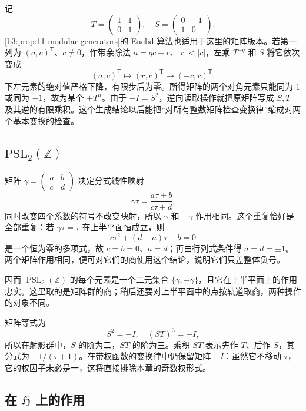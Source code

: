 记
\[
 T=\begin{pmatrix}1&1\\0&1\end{pmatrix},
 \quad S=\begin{pmatrix}0&-1\\1&0\end{pmatrix}.
\]
\cref{b3:prop:11-modular-generators}的 Euclid 算法也适用于这里的矩阵版本。若第一列为 \((a,c)^{\mathsf T}\)、\(c\ne0\)，作带余除法 \(a=qc+r\)、\(|r|<|c|\)，左乘 \(T^{-q}\) 和 \(S\) 将它依次变成
\[
 (a,c)^{\mathsf T}\longmapsto(r,c)^{\mathsf T}
 \longmapsto(-c,r)^{\mathsf T}.
\]
下左元素的绝对值严格下降，有限步后为零。所得矩阵的两个对角元素只能同为 \(1\) 或同为 \(-1\)，故为某个 \(\pm T^n\)。由于 \(-I=S^2\)，逆向读取操作就把原矩阵写成 \(S,T\) 及其逆的有限乘积。这个生成结论以后能把“对所有整数矩阵检查变换律”缩成对两个基本变换的检查。

\subsection{\texorpdfstring{\(\mathrm{PSL}_2(\mathbb Z)\)}{PSL2(Z)}}
\label{b3:subsec:230102}

矩阵 \(\gamma=\left(\begin{smallmatrix}a&b\\c&d\end{smallmatrix}\right)\) 决定分式线性映射
\[
 \gamma\tau=\frac{a\tau+b}{c\tau+d}.
\]
同时改变四个系数的符号不改变映射，所以 \(\gamma\) 和 \(-\gamma\) 作用相同。这个重复恰好是全部重复：若 \(\gamma\tau=\tau\) 在上半平面恒成立，则
\[
 c\tau^2+(d-a)\tau-b=0
\]
是一个恒为零的多项式，故 \(c=b=0\)、\(a=d\)；再由行列式条件得 \(a=d=\pm1\)。两个矩阵作用相同，便可对它们的商使用这个结论，说明它们只差整体负号。

因而 \(\operatorname{PSL}_2(\mathbb Z)\) 的每个元素是一个二元集合 \(\{\gamma,-\gamma\}\)，且它在上半平面上的作用忠实。这里取的是矩阵群的商；稍后还要对上半平面中的点按轨道取商，两种操作的对象不同。

矩阵等式为
\[
 S^2=-I,\quad (ST)^3=-I,
\]
所以在射影群中，\(S\) 的阶为二，\(ST\) 的阶为三。乘积 \(ST\) 表示先作 \(T\)、后作 \(S\)，其分式为 \(-1/(\tau+1)\)。在带权函数的变换律中仍保留矩阵 \(-I\)：虽然它不移动 \(\tau\)，它的权因子未必是一，这将直接排除本章的奇数权形式。

\subsection{在 \texorpdfstring{\(\mathfrak H\)}{上半平面} 上的作用}
\label{b3:subsec:230103}

